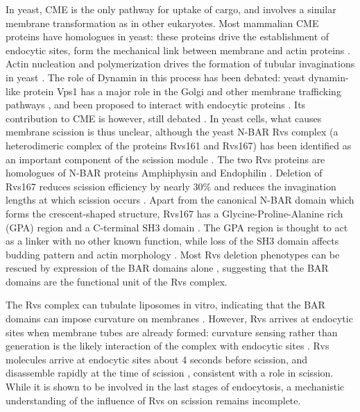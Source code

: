 \documentclass[9pt,lineno]{elife}
\begin{document}
In yeast, CME is the only pathway for uptake of cargo, and involves a similar membrane transformation as in other eukaryotes. Most mammalian CME proteins have homologues in yeast: these proteins drive the establishment of endocytic sites, form the mechanical link between membrane and actin proteins \citep{Kaksonen2018}. Actin nucleation and polymerization drives the formation of tubular invaginations in yeast \citep{Kubler1993a, Kaksonen2003}. The role of Dynamin in this process has been debated:  yeast dynamin-like protein Vps1 has a major role in the Golgi and other membrane trafficking pathways \citep{Rothman1990,Peters2004,Hoepfner2001}, and been proposed to interact with endocytic proteins \citep{Nannapaneni2010b, Yu2004,Smaczynska-deRooij2012}. Its contribution to CME is however, still debated \citep{GoudGadila2017,Kishimoto2011}. In yeast cells, what causes membrane scission is thus unclear, although the yeast N-BAR Rvs complex (a heterodimeric complex of the proteins Rvs161 and Rvs167) has been identified as an important component of the scission module \citep{Munn1995,Kaksonen2005,DHondt2000,Kishimoto2011}. The two Rvs proteins are homologues of N-BAR proteins Amphiphysin and Endophilin \citep{Friesen2006,Youn2010}. Deletion of Rvs167 reduces scission efficiency by nearly 30\% and reduces the invagination lengths at which scission occurs \citep{Kaksonen2005,Kukulski2012}. Apart from the canonical N-BAR domain which forms the crescent-shaped structure,  Rvs167 has a Glycine-Proline-Alanine rich (GPA) region and a C-terminal SH3 domain \citep{Sivadon1997}. The GPA region is thought to act as a linker with no other known function, while loss of the SH3 domain affects budding pattern and actin morphology \citep{Sivadon1997}. Most Rvs deletion phenotypes can be rescued by expression of the BAR domains alone \citep{Sivadon1997}, suggesting that the BAR domains are the functional unit of the Rvs complex.

The Rvs complex can tubulate liposomes in vitro, indicating that the BAR domains can impose curvature on membranes \citep{Youn2010}. However, Rvs arrives at endocytic sites when membrane tubes are already formed: curvature sensing rather than generation is the likely interaction of the complex with endocytic sites \citep{Kukulski2012,Picco2015}. Rvs molecules arrive at endocytic sites about 4 seconds before scission, and disassemble rapidly at the time of scission \citep{Picco2015}, consistent with a role in scission. While it is shown to be involved in the last stages of endocytosis, a mechanistic understanding of the influence of Rvs on scission remains incomplete. 
\end{document}
